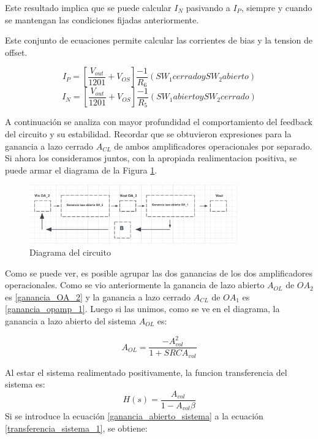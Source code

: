 \documentclass[12pt,a4paper]{article}
\begin{document}
Este resultado implica que se puede calcular $I_N$ pasivando a $I_P$, siempre y cuando se mantengan las condiciones fijadas anteriormente.

Este conjunto de ecuaciones permite calcular las corrientes de bias y la tension de offset.

\begin{equation} I_{P} = [\frac{V_{out}}{1201} + V_{OS}] \frac{-1}{R_6} (SW_1 cerrado y SW_2 abierto)\label{ecuacion_Ip}\end{equation}
\begin{equation} I_{N} = [\frac{V_{out}}{1201} + V_{OS}] \frac{-1}{R_5} (SW_1 abierto y SW_2 cerrado)\label{ecuacion_In}\end{equation}


A continuación se analiza con mayor profundidad el comportamiento del feedback del circuito y su estabilidad. Recordar que se obtuvieron expresiones para la ganancia a lazo cerrado $A_{CL}$ de ambos amplificadores operacionales 
por separado. Si ahora los consideramos juntos, con la apropiada realimentacion positiva, se puede armar el diagrama de la Figura \ref{diagrama}.

\begin{figure}[h!]                                                       
    \centering\includegraphics[width=0.8\textwidth]{Figuras/diagrama.png}
     \caption{Diagrama del circuito}
     \label{diagrama}
     \end{figure}

Como se puede ver, es posible agrupar las dos ganancias de los dos amplificadores operacionales. Como se vio anteriormente la ganancia de lazo abierto $A_{OL}$ de $OA_2$ es \ref{ganancia_OA_2} y la ganancia a lazo
cerrado $A_{CL}$ de $OA_1$ es \ref{ganancia_opamp_1}. Luego si las unimos, como se ve en el diagrama, la ganancia a lazo abierto del sistema $A_{OL}$ es:

\begin{equation} A_{OL}= \frac{-A_{vol}^2}{1+SRC A_{vol}}  \label{ganancia_abierto_sistema} \end{equation}

Al estar el sistema realimentado positivamente, la funcion transferencia del sistema es:  
\begin{equation} H (s) = \frac{A_{vol}}{1-A_{vol}\beta} \label{transferencia_sistema_1}  \end{equation}
Si se introduce la ecuación \ref{ganancia_abierto_sistema} a la ecuación \ref{transferencia_sistema_1}, se obtiene:
\end{document}
